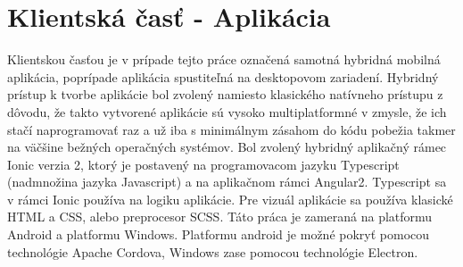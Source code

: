 \section{Klientská časť - Aplikácia}
Klientskou časťou je v prípade tejto práce označená samotná hybridná mobilná aplikácia, poprípade aplikácia spustiteľná na desktopovom zariadení. Hybridný prístup k tvorbe aplikácie bol zvolený namiesto klasického natívneho prístupu z dôvodu, že takto vytvorené aplikácie sú vysoko multiplatformné v zmysle, že ich stačí naprogramovať raz a už iba s minimálnym zásahom do kódu pobežia takmer na väčšine bežných operačných systémov. Bol zvolený hybridný aplikačný rámec Ionic verzia 2, ktorý je postavený na programovacom jazyku Typescript (nadmnožina jazyka Javascript) a na aplikačnom rámci Angular2. Typescript sa v rámci Ionic používa na logiku aplikácie. Pre vizuál aplikácie sa používa klasické HTML a CSS, alebo preprocesor SCSS. Táto práca je zameraná na  platformu Android a platformu Windows. Platformu android je možné pokryť pomocou technológie Apache Cordova, Windows zase pomocou technológie Electron. 
